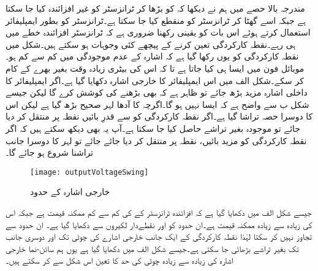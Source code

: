 مندرجہ بالا حصے میں ہم نے دیکھا کہ  کو بڑھا کر ٹرانزسٹر کو غیر افزائندہ کیا جا سکتا ہے جبکہ اسے گھٹا کر ٹرانزسٹر کو منقطع کیا جا سکتا ہے۔ٹرانزسٹر کو بطور ایمپلیفائر استعمال کرتے ہوئے اس بات کو یقینی رکھنا ضروری ہے کہ ٹرانزسٹر افزائندہ خطے میں ہی رہے۔نقطہ کارکردگی تعین کرنے کے پیچھے کئی وجوہات ہو سکتے ہیں۔شکل   میں نقطہ کارکردگی کو یوں رکھا گیا ہے کہ اشارہ کے عدم موجودگی میں  کم سے کم ہو۔موبائل فون میں ایسا ہی کیا جاتا ہے تا کہ اس کی بیٹری زیادہ وقت بغیر بھرے کے کام کر سکے۔شکل  الف   میں اس ایمپلیفائر کا خارجی اشارہ  دکھایا گیا ہے۔اگر ایمپلیفائر کا داخلی اشارہ  مزید بڑھ جائے تو ظاہر ہے کہ   بھی بڑھنے کی کوشش کرے گا لیکن جیسے شکل  ب سے واضح ہے کہ ایسا نہیں ہو گا۔اگرچہ  کا آدھا لہر  صحیح بڑھ گیا ہے لیکن اس کا دوسرا حصہ تراشا گیا ہے۔اگر نقطہ کارکردگی کو  سے قدرِ بائیں نقطہ    پر منتقل کر دیا جائے تو موجودہ  بغیر تراشے حاصل کیا جا سکتا ہے۔آپ یہ بھی دیکھ سکتے ہیں کہ اگر نقطہ کارکردگی کو مزید بائیں،  نقطہ  پر  منتقل کر دیا جائے جائے تو  لہر کا دوسرا جانب تراشنا شروع ہو جائے گا۔
\begin{figure}
\centering
\texttt{[image: outputVoltageSwing]}
\caption{خارجی اشارہ کے حدود}
\label{شکل_خارجی_اشارہ_کے_حدود}
\end{figure}
جیسے شکل  الف میں دکھایا گیا ہے کہ افزائندہ ٹرانزسٹر کے  کی کم سے کم ممکنہ قیمت  ہے جبکہ اس کی زیادہ سے زیادہ ممکنہ قیمت  ہے۔ان حدود کو  اور  نقطےدار لکیروں سے دکھایا گیا ہے۔  ان حدود سے تجاوز نہیں کر سکتا لہٰذا نقطہ کارکردگی  کے ایک جانب خارجی اشارے کی چوٹی   تک اور دوسری جانب  تک بغیر تراشے بڑھائی جا سکتی ہے۔جیسے شکل  الف   میں دکھایا گیا ہے یوں ہم سائن-نما خارجی اشارہ  کی زیادہ سے زیادہ چوٹی کی حد کا تعین اس شکل سے کر سکتے ہیں۔ 

